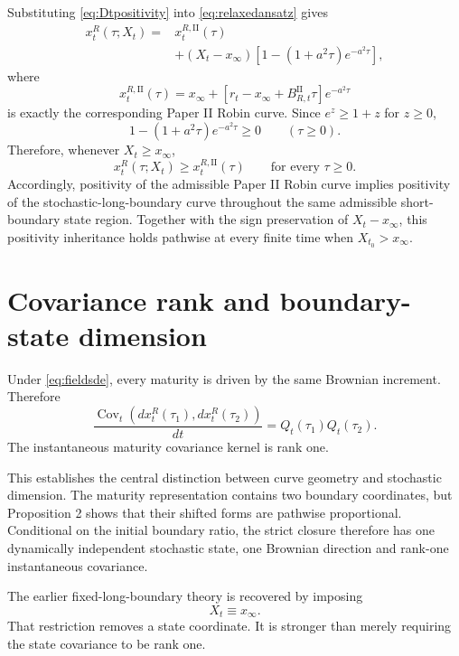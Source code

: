 \documentclass[11pt]{article}
\numberwithin{equation}{section}
\newcommand{\Cov}{\operatorname{Cov}}
\begin{document}
Substituting \eqref{eq:Dtpositivity} into \eqref{eq:relaxedansatz} gives
\begin{align}
 x_t^R(\tau;X_t)
 ={}&x_t^{R,\mathrm{II}}(\tau)
 \nonumber\\
 &+(X_t-x_\infty)
 \left[1-(1+a^2\tau)e^{-a^2\tau}\right],
 \label{eq:positivitycomparison}
\end{align}
where
\begin{equation}
 x_t^{R,\mathrm{II}}(\tau)
 =x_\infty+
 \left[r_t-x_\infty+B_{R,t}^{\mathrm{II}}\tau\right]e^{-a^2\tau}
\end{equation}
is exactly the corresponding Paper II Robin curve. Since $e^z\geq1+z$ for $z\geq0$,
\begin{equation}
 1-(1+a^2\tau)e^{-a^2\tau}\geq0
 \qquad(\tau\geq0).
\end{equation}
Therefore, whenever $X_t\geq x_\infty$,
\begin{equation}
 x_t^R(\tau;X_t)\geq x_t^{R,\mathrm{II}}(\tau)
 \qquad\text{for every }\tau\geq0.
\end{equation}
Accordingly, positivity of the admissible Paper II Robin curve implies positivity of the stochastic-long-boundary curve throughout the same admissible short-boundary state region. Together with the sign preservation of $X_t-x_\infty$, this positivity inheritance holds pathwise at every finite time when $X_{t_0}>x_\infty$.

\section{Covariance rank and boundary-state dimension}

Under \eqref{eq:fieldsde}, every maturity is driven by the same Brownian increment. Therefore
\begin{equation}
 {
 \frac{\Cov_t(dx_t^R(\tau_1),dx_t^R(\tau_2))}{dt}
 =Q_t(\tau_1)Q_t(\tau_2).
 }
 \label{eq:rankonekernel}
\end{equation}
The instantaneous maturity covariance kernel is rank one.

This establishes the central distinction between curve geometry and stochastic dimension. The maturity representation contains two boundary coordinates, but Proposition 2 shows that their shifted forms are pathwise proportional. Conditional on the initial boundary ratio, the strict closure therefore has one dynamically independent stochastic state, one Brownian direction and rank-one instantaneous covariance.

The earlier fixed-long-boundary theory is recovered by imposing
\begin{equation}
 X_t\equiv x_\infty.
\end{equation}
That restriction removes a state coordinate. It is stronger than merely requiring the state covariance to be rank one.
\end{document}
